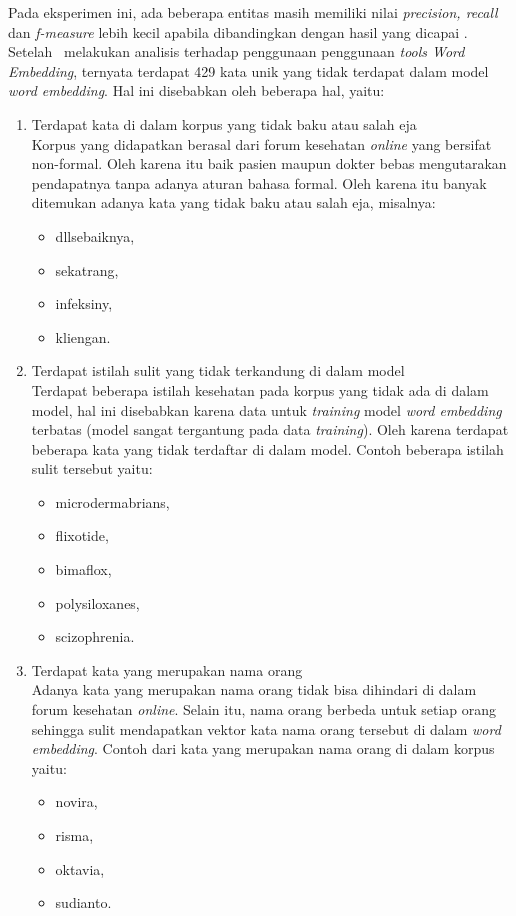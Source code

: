 	Pada eksperimen ini, ada beberapa entitas masih memiliki nilai \textit{precision, recall} dan \textit{f-measure} lebih kecil apabila dibandingkan dengan hasil yang dicapai \cite{skripsiKakRadit}. Setelah \saya~melakukan analisis terhadap penggunaan penggunaan \textit{tools Word Embedding}, ternyata terdapat 429 kata unik yang tidak terdapat dalam model \textit{word embedding}. Hal ini disebabkan oleh beberapa hal, yaitu:
	\begin{enumerate}
		\item Terdapat kata di dalam korpus yang tidak baku atau salah eja\\
		Korpus yang didapatkan berasal dari forum kesehatan \textit{online} yang bersifat non-formal. Oleh karena itu baik pasien maupun dokter bebas mengutarakan pendapatnya tanpa adanya aturan bahasa formal. Oleh karena itu banyak ditemukan adanya kata yang tidak baku atau salah eja, misalnya:
		\begin{itemize}
			\item dllsebaiknya,
			\item sekatrang,
			\item infeksiny,
			\item kliengan.
		\end{itemize}
		
		\item Terdapat istilah sulit yang tidak terkandung di dalam model\\
		Terdapat beberapa istilah kesehatan pada korpus yang tidak ada di dalam model, hal ini disebabkan karena data untuk \textit{training} model \textit{word embedding} terbatas (model sangat tergantung pada data \textit{training}). Oleh karena terdapat beberapa kata yang tidak terdaftar di dalam model. Contoh beberapa istilah sulit tersebut yaitu:
		\begin{itemize}
			\item microdermabrians,
			\item flixotide,
			\item bimaflox,
			\item polysiloxanes,
			\item scizophrenia.
		\end{itemize}
	
		\item Terdapat kata yang merupakan nama orang\\
		Adanya kata yang merupakan nama orang tidak bisa dihindari di dalam forum kesehatan \textit{online}. Selain itu, nama orang berbeda untuk setiap orang sehingga sulit mendapatkan vektor kata nama orang tersebut di dalam \textit{word embedding}. Contoh dari kata yang merupakan nama orang di dalam korpus yaitu:
		\begin{itemize}
			\item novira,
			\item risma,
			\item oktavia,
			\item sudianto.
		\end{itemize}
	\end{enumerate}
	
